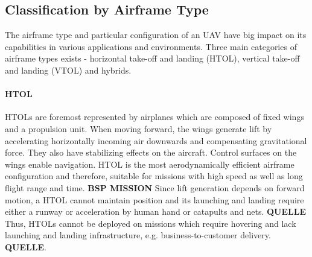 \subsection{Classification by Airframe Type}
The airframe type and particular configuration
of an UAV
have big impact on its
capabilities in
various applications 
and environments. \cite{Kong2010}
Three main categories
of airframe types exists -
horizontal take-off and landing (HTOL),
vertical take-off and landing (VTOL)
and hybrids.

\paragraph{HTOL}
HTOLs are foremost represented by airplanes
which are composed of fixed wings
and a propulsion unit.
When moving forward, the wings
generate lift 
by accelerating horizontally incoming
air downwards and compensating
gravitational force.
They also have stabilizing effects
on the aircraft.
Control surfaces on the wings
enable navigation.
HTOL is
the most aerodynamically efficient airframe configuration
and therefore, suitable for missions
with high speed as well as
long flight range and time.
\textbf{BSP MISSION}
Since lift generation depends on forward motion,
a HTOL cannot maintain position and
its launching and landing 
require either a runway or
acceleration by human hand or catapults and nets.
\textbf{QUELLE}
Thus, HTOLs cannot be deployed
on missions
which require hovering and lack
launching and landing infrastructure, e.g.
business-to-customer delivery.
\textbf{QUELLE}.

